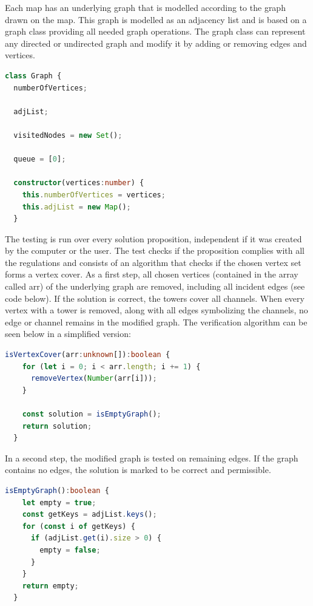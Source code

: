 Each map has an underlying graph that is modelled according to the graph drawn on the map. This graph is modelled as an adjacency list and is based on a graph class providing all needed graph operations. The graph class can represent any directed or undirected graph and modify it by adding or removing edges and vertices.

\begin{lstlisting}[language=TypeScript,caption={},label={lst:graphClass}]
 class Graph {
  numberOfVertices;

  adjList;

  visitedNodes = new Set();

  queue = [0];

  constructor(vertices:number) {
    this.numberOfVertices = vertices;
    this.adjList = new Map();
  }
\end{lstlisting}

The testing is run over every solution proposition, independent if it was created by the computer or the user. The test checks if the proposition complies with all the regulations and consists of an algorithm that checks if the chosen vertex set forms a vertex cover. As a first step, all chosen vertices (contained in the array called arr) of the underlying graph are removed, including all incident edges (see code below). If the solution is correct, the towers cover all channels. When every vertex with a tower is removed, along with all edges symbolizing the channels, no edge or channel remains in the modified graph. The verification algorithm can be seen below in a simplified version:

\newpage
\begin{lstlisting}[language=TypeScript,caption={},label={lst:isVertexCover}]
  isVertexCover(arr:unknown[]):boolean {
    for (let i = 0; i < arr.length; i += 1) {
      removeVertex(Number(arr[i]));
    }

    const solution = isEmptyGraph();
    return solution;
  }
\end{lstlisting}

In a second step, the modified graph is tested on remaining edges. If the graph contains no edges, the solution is marked to be correct and permissible. 

\begin{lstlisting}[language=TypeScript,caption={},label={lst:isEmptyGraph}]
 isEmptyGraph():boolean {
    let empty = true;
    const getKeys = adjList.keys();
    for (const i of getKeys) {
      if (adjList.get(i).size > 0) {
        empty = false;
      }
    }
    return empty;
  }
\end{lstlisting}

